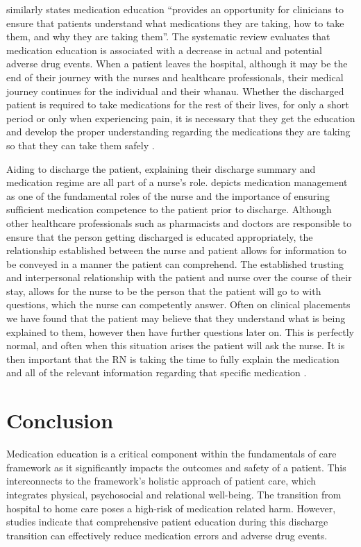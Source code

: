 \documentclass[british,12pt,a4paper]{article}
\begin{document}
	\citeauthor{Alper2023} similarly states medication education “provides an opportunity for clinicians to ensure that patients understand what medications they are taking, how to take them, and why they are taking them”. The systematic review evaluates that medication education is associated with a decrease in actual and potential adverse drug events. When a patient leaves the hospital, although it may be the end of their journey with the nurses and healthcare professionals, their medical journey continues for the individual and their whanau. Whether the discharged patient is required to take medications for the rest of their lives, for only a short period or only when experiencing pain, it is necessary that they get the education and develop the proper understanding regarding the medications they are taking so that they can take them safely \parencite{Yap2016}. 

	Aiding to discharge the patient, explaining their discharge summary and medication regime are all part of a nurse's role. \textcite{Sulosaari2014} depicts medication management as one of the fundamental roles of the nurse and the importance of ensuring sufficient medication competence to the patient prior to discharge. Although other healthcare professionals such as pharmacists and doctors are responsible to ensure that the person getting discharged is educated appropriately, the relationship established between the nurse and patient allows for information to be conveyed in a manner the patient can comprehend. The established trusting and interpersonal relationship with the patient and nurse over the course of their stay, allows for the nurse to be the person that the patient will go to with questions, which the nurse can competently answer. Often on clinical placements we have found that the patient may believe that they understand what is being explained to them, however then have further questions later on. This is perfectly normal, and often when this situation arises the patient will ask the nurse. It is then important that the RN is taking the time to fully explain the medication and all of the relevant information regarding that specific medication \parencite{Flatman2021}.
	\section{Conclusion}
	Medication education is a critical component within the fundamentals of care framework as it significantly impacts the outcomes and safety of a patient. This interconnects to the framework's holistic approach of patient care, which integrates physical, psychosocial and relational well-being. The transition from hospital to home care poses a high-risk of medication related harm. However, studies indicate that comprehensive patient education during this discharge transition can effectively reduce medication errors and adverse drug events.
\end{document}
